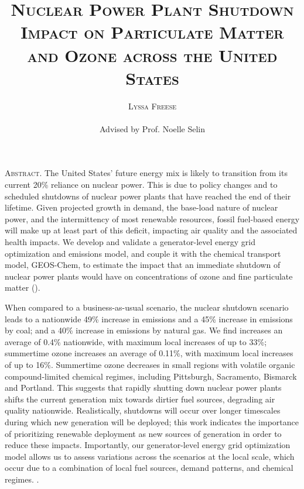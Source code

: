 \documentclass[12]{article}
\title{{\textsc{\Large Nuclear Power Plant Shutdown Impact on Particulate Matter and Ozone across the United States}}}
\author{\textsc{Lyssa Freese}
\\\\
Advised by Prof. Noelle Selin}
\begin{document}
\maketitle
\thispagestyle{empty}

\setlength{\leftskip}{1.1cm}
\setlength{\rightskip}{1.1cm}


\bigskip
\bigskip

{\textsc{Abstract.} 
The United States’ future energy mix is likely to transition from its current 20\% reliance on nuclear power. This is due to policy changes and to scheduled shutdowns of nuclear power plants that have reached the end of their lifetime. Given projected growth in demand, the base-load nature of nuclear power, and the intermittency of most renewable resources, fossil fuel-based energy will make up at least part of this deficit, impacting air quality and the associated health impacts. We develop and validate a generator-level energy grid optimization and emissions model, and couple it with the chemical transport model, GEOS-Chem, to estimate the impact that an immediate shutdown of nuclear power plants would have on concentrations of ozone and fine particulate matter ().

When compared to a business-as-usual scenario, the nuclear shutdown scenario leads to a nationwide 49\% increase in  emissions and a 45\% increase in  emissions by coal; and a 40\% increase in  emissions by natural gas. We find  increases an average of 0.4\% nationwide, with maximum local increases of up to 33\%; summertime ozone increases an average of 0.11\%, with maximum local increases of up to 16\%. Summertime ozone decreases in small regions with volatile organic compound-limited chemical regimes, including Pittsburgh, Sacramento, Bismarck and Portland. This suggests that rapidly shutting down nuclear power plants shifts the current generation mix towards dirtier fuel sources, degrading air quality nationwide. Realistically, shutdowns will occur over longer timescales during which new generation will be deployed; this work indicates the importance of prioritizing renewable deployment as new sources of generation in order to reduce these impacts. Importantly, our generator-level energy grid optimization model allows us to assess variations across the scenarios at the local scale, which occur due to a combination of local fuel sources, demand patterns, and chemical regimes. 
 .}

\bigskip
\bigskip 
\clearpage
\setcounter{page}{1}
\end{document}

